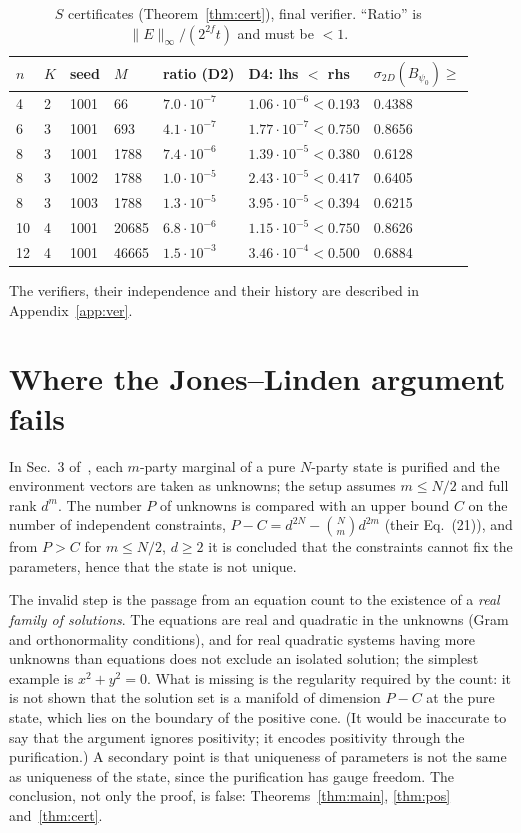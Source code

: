 \documentclass[aps,pra,onecolumn,superscriptaddress,nofootinbib,longbibliography,10pt]{revtex4-2}
\theoremstyle{definition}
\begin{document}
\begin{table}[h]
\caption{$S$ certificates (Theorem~\ref{thm:cert}), final verifier. ``Ratio'' is $\|E\|_\infty/(2^{2f}t)$ and must be $<1$.}\label{tab:S}
\begin{tabular}{lllllll}
\toprule
$n$ & $K$ & seed & $M$ & ratio (D2) & D4: lhs $<$ rhs & $\sigma_{2D}(B_{\psi_0})\ge$\\
\midrule
4 & 2 & 1001 & 66 & $7.0\cdot10^{-7}$ & $1.06\cdot10^{-6}<0.193$ & 0.4388\\
6 & 3 & 1001 & 693 & $4.1\cdot10^{-7}$ & $1.77\cdot10^{-7}<0.750$ & 0.8656\\
8 & 3 & 1001 & 1788 & $7.4\cdot10^{-6}$ & $1.39\cdot10^{-5}<0.380$ & 0.6128\\
8 & 3 & 1002 & 1788 & $1.0\cdot10^{-5}$ & $2.43\cdot10^{-5}<0.417$ & 0.6405\\
8 & 3 & 1003 & 1788 & $1.3\cdot10^{-5}$ & $3.95\cdot10^{-5}<0.394$ & 0.6215\\
10 & 4 & 1001 & 20685 & $6.8\cdot10^{-6}$ & $1.15\cdot10^{-5}<0.750$ & 0.8626\\
12 & 4 & 1001 & 46665 & $1.5\cdot10^{-3}$ & $3.46\cdot10^{-4}<0.500$ & 0.6884\\
\bottomrule
\end{tabular}
\end{table}

The verifiers, their independence and their history are described in Appendix~\ref{app:ver}.

\section{Where the Jones--Linden argument fails}\label{sec:JL}
In Sec.~3 of~\cite{JL05}, each $m$-party marginal of a pure $N$-party state is purified and the environment vectors are taken as unknowns; the setup assumes $m\le N/2$ and full rank $d^m$. The number $P$ of unknowns is compared with an upper bound $C$ on the number of independent constraints, $P-C=d^{2N}-\binom Nm d^{2m}$ (their Eq.~(21)), and from $P>C$ for $m\le N/2$, $d\ge2$ it is concluded that the constraints cannot fix the parameters, hence that the state is not unique.

The invalid step is the passage from an equation count to the existence of a \emph{real family of solutions}. The equations are real and quadratic in the unknowns (Gram and orthonormality conditions), and for real quadratic systems having more unknowns than equations does not exclude an isolated solution; the simplest example is $x^2+y^2=0$. What is missing is the regularity required by the count: it is not shown that the solution set is a manifold of dimension $P-C$ at the pure state, which lies on the boundary of the positive cone. (It would be inaccurate to say that the argument ignores positivity; it encodes positivity through the purification.) A secondary point is that uniqueness of parameters is not the same as uniqueness of the state, since the purification has gauge freedom. The conclusion, not only the proof, is false: Theorems~\ref{thm:main}, \ref{thm:pos} and~\ref{thm:cert}.
\end{document}
